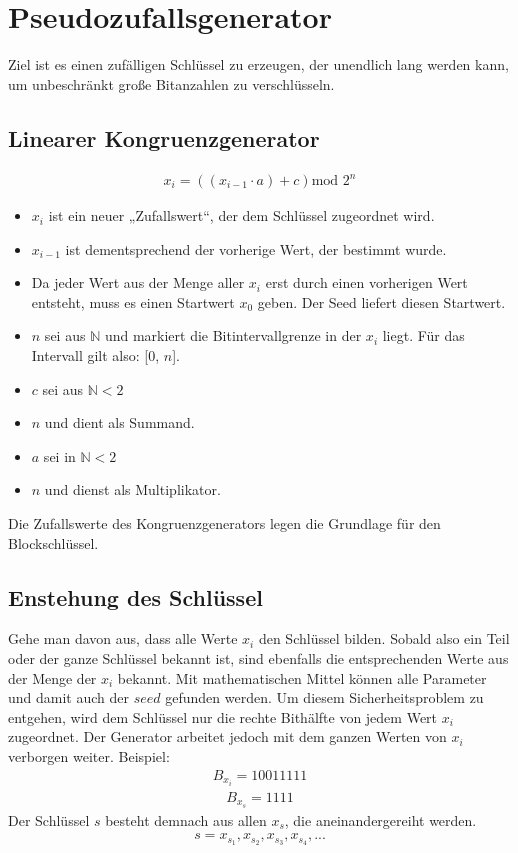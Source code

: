\documentclass[10pt,a4paper]{article}
\begin{document}
\section{Pseudozufallsgenerator}

Ziel ist es einen \glqq zufälligen\grqq{} Schlüssel zu erzeugen, der unendlich lang werden kann, um unbeschränkt große Bitanzahlen zu verschlüsseln.

\subsection{Linearer Kongruenzgenerator}

\begin{align*}
    x_i=\left(\left( x_{i-1}\cdot a\right) +c\right) \text{mod } 2^n
\end{align*}
\begin{itemize}
    \item $x_i$ ist ein neuer „Zufallswert“, der dem Schlüssel zugeordnet wird.
    \item $x_{i-1}$ ist dementsprechend der vorherige Wert, der bestimmt wurde.
    \item Da jeder Wert aus der Menge aller $x_i$ erst durch einen vorherigen Wert entsteht, muss es einen Startwert $x_0$ geben. Der Seed liefert diesen Startwert.
    \item $n$ sei aus $ \mathbb{N} $ und markiert die Bitintervallgrenze in der $x_i$ liegt.
Für das Intervall gilt also: [0, $n$].
    \item $c$ sei aus  $ \mathbb{N}<2 $
    \item $n$ und dient als Summand.
    \item $a$ sei in $ \mathbb{N}< 2 $
    \item $n$ und dienst als Multiplikator.

\end{itemize}
Die \glqq Zufallswerte\grqq{} des Kongruenzgenerators legen die Grundlage für den Blockschlüssel.

\subsection{Enstehung des Schlüssel}

Gehe man davon aus, dass alle Werte $x_i$ den Schlüssel bilden. Sobald also ein Teil oder der ganze Schlüssel bekannt ist, sind ebenfalls die entsprechenden Werte aus der Menge der $x_i$ bekannt. Mit mathematischen Mittel können alle Parameter und damit auch der $seed$ gefunden werden.
Um diesem Sicherheitsproblem zu entgehen, wird dem Schlüssel nur die rechte Bithälfte von jedem Wert $x_i$ zugeordnet.
Der Generator arbeitet jedoch mit dem ganzen Werten von $x_i$ verborgen weiter. 
Beispiel:
\begin{align*}
    B_{x_i} = 1001 1111
\end{align*}
\begin{align*}
    B_{x_s} = 1111
\end{align*}
Der Schlüssel $s$ besteht demnach aus allen $x_s$, die aneinandergereiht werden.
\begin{align*}
    s = x_{s_1}, x_{s_2}, x_{s_3}, x_{s_4}, ...
\end{align*}
\end{document}
